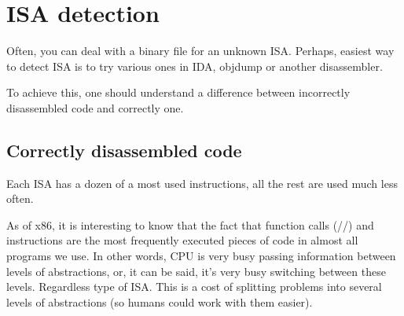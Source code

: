 \section{\ac{ISA} detection}
\label{ISA_detect}

Often, you can deal with a binary file for an unknown \ac{ISA}.
Perhaps, easiest way to detect \ac{ISA} is to try various ones in IDA, objdump or another disassembler.

To achieve this, one should understand a difference between incorrectly disassembled code and correctly one.

\renewcommand{\CURPATH}{digging_into_code/incorrect_disassembly}


\subsection{Correctly disassembled code}
\label{correctly_disasmed_code}

Each \ac{ISA} has a dozen of a most used instructions, all the rest are used much less often.

As of x86, it is interesting to know that the fact that function calls (\PUSH/\CALL/\ADD) and \MOV
instructions are the most frequently executed pieces of code in almost all
programs we use.
In other words, \ac{CPU} is very busy passing information between levels of abstractions, or,
it can be said, it's very busy switching between these levels.
Regardless type of \ac{ISA}.
This is a cost of splitting problems into several levels of abstractions (so humans could work with them easier).


